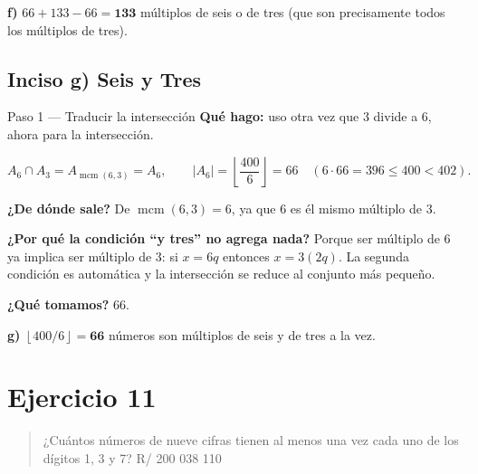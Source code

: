 \documentclass[11pt]{article}
\begin{document}
\begin{resp}
\textbf{f)} $66+133-66 = \mathbf{133}$ múltiplos de seis o de tres (que son precisamente todos los múltiplos de tres).
\end{resp}

\subsection*{Inciso g) Seis y Tres}

\begin{paso}{Paso 1 --- Traducir la intersección}
\textbf{Qué hago:} uso otra vez que $3$ divide a $6$, ahora para la intersección.

\[
A_6\cap A_3 = A_{\operatorname{mcm}(6,3)} = A_6,\qquad
|A_6| = \left\lfloor \frac{400}{6}\right\rfloor = 66 \quad (6\cdot 66 = 396 \le 400 < 402).
\]

\textbf{¿De dónde sale?} De $\operatorname{mcm}(6,3)=6$, ya que $6$ es él mismo múltiplo de $3$.

\textbf{¿Por qué la condición ``y tres'' no agrega nada?} Porque ser múltiplo de $6$ ya implica ser múltiplo de $3$: si $x=6q$ entonces $x = 3(2q)$. La segunda condición es automática y la intersección se reduce al conjunto más pequeño.

\textbf{¿Qué tomamos?} $66$.
\end{paso}

\begin{resp}
\textbf{g)} $\left\lfloor 400/6\right\rfloor = \mathbf{66}$ números son múltiplos de seis y de tres a la vez.
\end{resp}

\section*{Ejercicio 11}

\begin{quote}
¿Cuántos números de nueve cifras tienen al menos una vez cada uno de los dígitos 1, 3 y 7? \hfill R/ 200 038 110
\end{quote}
\end{document}
